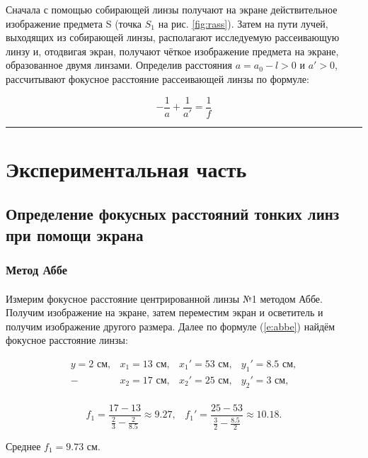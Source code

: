 \documentclass[a4paper,12pt]{article} %
\begin{document}
Сначала с помощью собирающей линзы получают на экране действительное изображение предмета S (точка $S_1$ на рис. \ref{fig:rass}). Затем на пути лучей, выходящих из собирающей линзы, располагают исследуемую рассеивающую линзу и, отодвигая экран, получают чёткое изображение предмета на экране, образованное двумя линзами. Определив расстояния $a = a_0 - l > 0$ и $a' > 0$, рассчитывают фокусное расстояние рассеивающей линзы по формуле:

\begin{equation}
-\frac{1}{a} 	+ \frac{1}{a'} = \frac{1}{f}
\label{e:rass}
\end{equation}

\medskip\hrule\medskip

\FloatBarrier

\section{Экспериментальная часть}

\subsection{Определение фокусных расстояний тонких линз при помощи экрана}

\subsubsection{Метод Аббе}

\paragraph{} Измерим фокусное расстояние центрированной линзы №1 методом Аббе. Получим изображение на экране, затем переместим экран и осветитель и получим изображение другого размера. Далее по формуле (\ref{e:abbe}) найдём фокусное расстояние линзы:

\[
\begin{array}{llll}
y = 2 \text{ см}, 	& x_1 = 13 \text{ см},	& x_1' = 53 \text{ см}, & y_1' = 8.5 \text{ см}, \\
 - 					& x_2 = 17 \text{ см},	& x_2' = 25 \text{ см}, & y_2' = 3 \text{ см}, \\
\end{array}
\]

\[
f_1 = \frac{17 - 13}{\frac{2}{3} - \frac{2}{8.5}} \approx 9.27, \;\;\;
f_1' = \frac{25 - 53}{\frac{3}{2} - \frac{8.5	}{2}} \approx 10.18.
\]

\noindent Среднее $f_1 = 9.73$ см.
\end{document}
